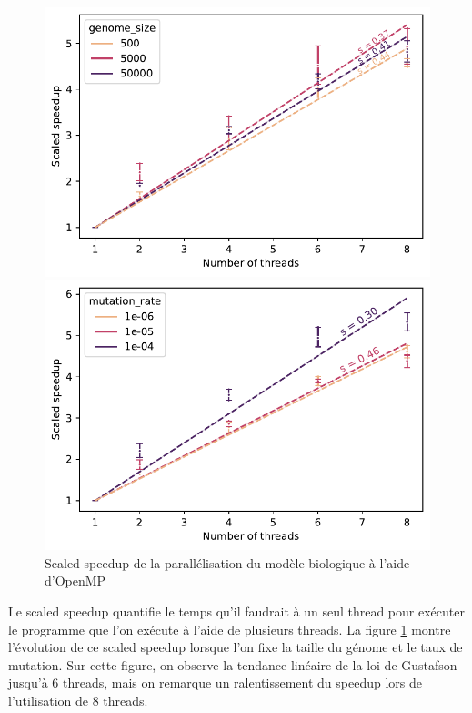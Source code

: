 \documentclass[a4paper, 10pt, twoside]{article}
\begin{document}
\begin{figure}[htb]
	\centering
	\begin{minipage}{0.45\textwidth}
		\centering
		\includegraphics[width=\textwidth]{img/weak_speedup_genome_size.pdf}
	\end{minipage}
	\begin{minipage}{0.45\textwidth}
		\includegraphics[width=\textwidth]{img/weak_speedup_mutation_rate.pdf}
	\end{minipage}
	\caption{Scaled speedup de la parallélisation du modèle biologique à l'aide d'OpenMP}
	\label{fig:scaled-speedup/omp}
\end{figure}

Le scaled speedup quantifie le temps qu'il faudrait à un seul thread pour exécuter le programme que l'on exécute à l'aide de plusieurs threads. La figure \ref{fig:scaled-speedup/omp} montre l'évolution de ce scaled speedup lorsque l'on fixe la taille du génome et le taux de mutation. Sur cette figure, on observe la tendance linéaire de la loi de Gustafson jusqu'à 6 threads, mais on remarque un ralentissement du speedup lors de l'utilisation de 8 threads.
\end{document}
